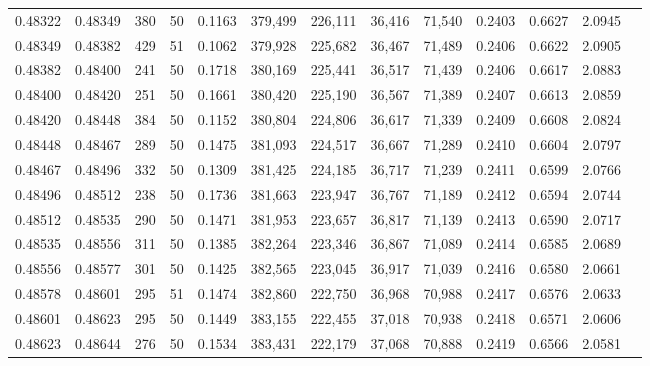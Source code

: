 \begin{tabular}{rrrrrrrrrrrrr}
0.48322 & 0.48349 &   380 &  50 &                                     0.1163 & 379,499 & 226,111 &  36,416 &  71,540 & 0.2403 & 0.6627 & 2.0945 \\
0.48349 & 0.48382 &   429 &  51 &                                     0.1062 & 379,928 & 225,682 &  36,467 &  71,489 & 0.2406 & 0.6622 & 2.0905 \\
0.48382 & 0.48400 &   241 &  50 &                                     0.1718 & 380,169 & 225,441 &  36,517 &  71,439 & 0.2406 & 0.6617 & 2.0883 \\
0.48400 & 0.48420 &   251 &  50 &                                     0.1661 & 380,420 & 225,190 &  36,567 &  71,389 & 0.2407 & 0.6613 & 2.0859 \\
0.48420 & 0.48448 &   384 &  50 &                                     0.1152 & 380,804 & 224,806 &  36,617 &  71,339 & 0.2409 & 0.6608 & 2.0824 \\
0.48448 & 0.48467 &   289 &  50 &                                     0.1475 & 381,093 & 224,517 &  36,667 &  71,289 & 0.2410 & 0.6604 & 2.0797 \\
0.48467 & 0.48496 &   332 &  50 &                                     0.1309 & 381,425 & 224,185 &  36,717 &  71,239 & 0.2411 & 0.6599 & 2.0766 \\
0.48496 & 0.48512 &   238 &  50 &                                     0.1736 & 381,663 & 223,947 &  36,767 &  71,189 & 0.2412 & 0.6594 & 2.0744 \\
0.48512 & 0.48535 &   290 &  50 &                                     0.1471 & 381,953 & 223,657 &  36,817 &  71,139 & 0.2413 & 0.6590 & 2.0717 \\
0.48535 & 0.48556 &   311 &  50 &                                     0.1385 & 382,264 & 223,346 &  36,867 &  71,089 & 0.2414 & 0.6585 & 2.0689 \\
0.48556 & 0.48577 &   301 &  50 &                                     0.1425 & 382,565 & 223,045 &  36,917 &  71,039 & 0.2416 & 0.6580 & 2.0661 \\
0.48578 & 0.48601 &   295 &  51 &                                     0.1474 & 382,860 & 222,750 &  36,968 &  70,988 & 0.2417 & 0.6576 & 2.0633 \\
0.48601 & 0.48623 &   295 &  50 &                                     0.1449 & 383,155 & 222,455 &  37,018 &  70,938 & 0.2418 & 0.6571 & 2.0606 \\
0.48623 & 0.48644 &   276 &  50 &                                     0.1534 & 383,431 & 222,179 &  37,068 &  70,888 & 0.2419 & 0.6566 & 2.0581 \\

\end{tabular}
